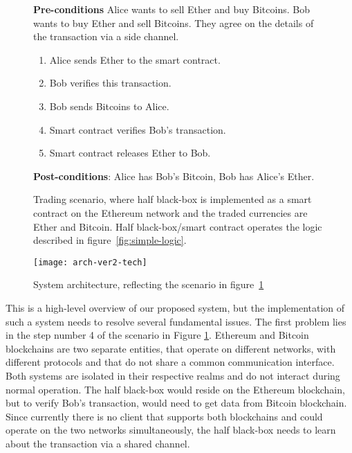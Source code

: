 \begin{figure}[ht]
    \begin{framed}
    \textbf{Pre-conditions} Alice wants to sell Ether and buy Bitcoins. Bob wants to buy Ether and sell Bitcoins. They agree on the details of the transaction via a side channel.
 
    \begin{enumerate}[noitemsep]
        \item Alice sends Ether to the smart contract.
        \item Bob verifies this transaction.
        \item Bob sends Bitcoins to Alice.
        \item Smart contract verifies Bob’s transaction.
        \item Smart contract releases Ether to Bob.
    \end{enumerate}
      
    \textbf{Post-conditions}: Alice has Bob’s Bitcoin, Bob has Alice’s Ether.

    \end{framed}
    \caption{Trading scenario, where half black-box is implemented as a smart contract on the Ethereum network and the traded currencies are Ether and Bitcoin. Half black-box/smart contract operates the logic described in figure~\ref{fig:simple-logic}.}
    \label{fig:ethereum-case}
\end{figure}

\begin{figure}[ht]
    \centering
    \texttt{[image: arch-ver2-tech]}
    \caption{System architecture, reflecting the scenario in figure~\ref{fig:ethereum-case}}
    \label{fig:arch-ver2-tech}
\end{figure}

This is a high-level overview of our proposed system, but the implementation of such a system needs to resolve several fundamental issues. The first problem lies in the step number 4 of the scenario in Figure \ref{fig:ethereum-case}. Ethereum and Bitcoin blockchains are two separate entities, that operate on different networks, with different protocols and that do not share a common communication interface. Both systems are isolated in their respective realms and do not interact during normal operation\footnotemark. The half black-box would reside on the Ethereum blockchain, but to verify Bob’s transaction, would need to get data from Bitcoin blockchain. Since currently there is no client that supports both blockchains and could operate on the two networks simultaneously, the half black-box needs to learn about the transaction via a shared channel.
% 

